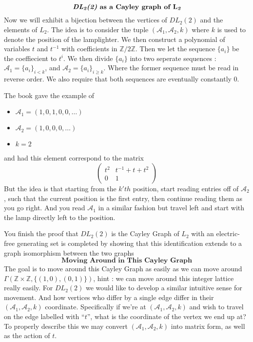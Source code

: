 \[\textbf{\textit{DL$_\textit{2}$(2)} as a Cayley graph of L$_\textit{2}$}\]
Now we will exhibit a bijection between the vertices of $DL_2(2)$ and the elements of $L_2$. The idea is to consider the tuple $(\mathcal{A}_1,\mathcal{A}_2,k)$ where $k$ is used to denote the position of the lamplighter. We then construct a polynomial of variables $t$ and $t^{-1}$ with coefficients in $\mathbb{Z}/2\mathbb{Z}$. Then we let the sequence $\{a_i\}$ be the coeffiecient to $t^{i}$. We then divide $\{a_i\}$ into two seperate sequences : $\mathcal{A}_1 = \{a_i\}_{i<k}$, and $\mathcal{A}_2 = \{a_i\}_{i\geq k}$. Where the former sequence must be read in reverse order. We also require that both sequences are eventually constantly 0.
\begin{remark}
    The book gave the example of
    \begin{itemize}
        \item $\mathcal{A}_1=(1,0,1,0,0,\ldots)$ 
        \item $\mathcal{A}_2=(1,0,0,0,\ldots)$
        \item $k=2$
    \end{itemize}
    and had this element correspond to the matrix
    \[\begin{pmatrix}
        t^2 & t^{-1}+t+t^2\\
        0 & 1
    \end{pmatrix}\]
    But the idea is that starting from the $k'th$ position, start reading entries off of $\mathcal{A}_2$, such that the current position is the first entry, then continue reading them as you go right. And you read $\mathcal{A}_1$ in a similar fashion but travel left and start with the lamp directly left to the position.
\end{remark}
You finish the proof that $DL_2(2)$ is the Cayley Graph of $L_2$ with an electric-free generating set is completed by showing that this identification extends to a graph isomorphism between the two graphs
\newpage
\[\textbf{Moving Around in This Cayley Graph}\]
The goal is to move around this Cayley Graph as easily as we can move around $\Gamma(\mathbb{Z}\times\mathbb{Z},\{(1,0),(0,1)\})$, hint : we can move around this integer lattice really easily. For $DL_2(2)$ we would like to develop a similar intuitive sense for movement. And how vertices who differ by a single edge differ in their $(\mathcal{A}_1,\mathcal{A}_2,k)$ coordinate. Specifically if we're at $(\mathcal{A}_1,\mathcal{A}_2,k)$ and wish to travel on the edge labelled with ``$t$'', what is the coordinate of the vertex we end up at? To properly describe this we may convert $(\mathcal{A}_1,\mathcal{A}_2,k)$ into matrix form, as well as the action of $t$.
